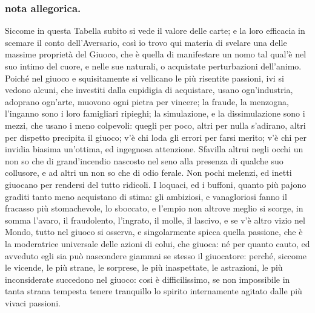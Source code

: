 \documentclass[11pt,a6paper]{article}
\begin{document}
\subsubsection{nota allegorica.}
{\footnotesize
 Siccome in questa Tabella subito si vede il
 valore delle carte; e la loro efficacia in scemare il conto
dell'Aversario, così io trovo qui materia di svelare
una delle massime proprietà del Giuoco, che è
quella di manifestare un nomo tal qual'è nel suo intimo
del cuore, e nelle sue naturali, o acquistate perturbazioni
dell'animo. Poiché nel giuoco e squisitamente
si vellicano le più risentite passioni, ivi si
vedono alcuni, che investiti dalla cupidigia di
acquistare, usano ogn'industria, adoprano ogn'arte,
muovono ogni pietra per vincere; la fraude, la
menzogna, l'inganno sono i loro famigliari ripieghi; la
simulazione, e la dissimulazione sono i
mezzi, che usano i meno colpevoli: quegli per poco,
altri per nulla s'adirano, altri per dispetto
precipita il giuoco; v'è chi loda gli errori per farsi merito;
v'è chi per invidia biasima un'ottima, ed ingegnosa
attenzione. Sfavilla altrui negli occhi un non so che di
grand'incendio nascosto nel seno alla presenza di
qualche suo collusore, e ad altri un non so che di
odio ferale. Non pochi melenzi, ed inetti giuocano
per rendersi del tutto ridicoli. I loquaci, ed i
buffoni, quanto più pajono graditi tanto meno acquistano
di stima: gli ambiziosi, e vanagloriosi fanno il fracasso
più stomachevole, lo sboccato, e l'empio non
altrove meglio si scorge, in somma l'avaro, il fraudolento,
l'ingrato, il molle, il lascivo, e se v'è altro
vizio nel Mondo, tutto nel giuoco si osserva, e
singolarmente spicca quella passione, che è la moderatrice
universale delle azioni di colui, che giuoca:
né per quanto cauto, ed avveduto egli sia può
nascondere giammai se stesso il giuocatore: perché,
siccome le vicende, le più strane, le sorprese, le più
inaspettate, le astrazioni, le più inconsiderate
succedono nel giuoco: cosi è difficilissimo, se non
impossibile in tanta strana tempesta tenere tranquillo
lo spirito internamente agitato dalle più vivaci
passioni.

}
\end{document}
